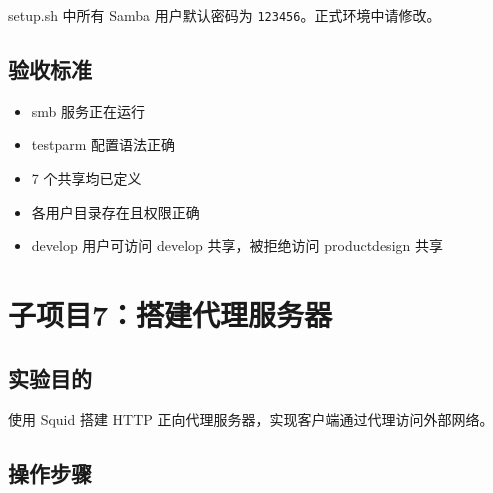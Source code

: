 \documentclass[12pt,a4paper]{ctexart}
\begin{document}
\begin{warnbox}
  setup.sh 中所有 Samba 用户默认密码为 \texttt{123456}。正式环境中请修改。
\end{warnbox}

\subsection{验收标准}

\begin{itemize}
  \item smb 服务正在运行
  \item testparm 配置语法正确
  \item 7 个共享均已定义
  \item 各用户目录存在且权限正确
  \item develop 用户可访问 develop 共享，被拒绝访问 productdesign 共享
\end{itemize}

\newpage
\section{子项目7：搭建代理服务器}

\subsection{实验目的}

使用 Squid 搭建 HTTP 正向代理服务器，实现客户端通过代理访问外部网络。

\subsection{操作步骤}
\end{document}
